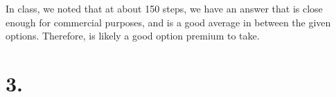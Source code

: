 \documentclass{article}
\begin{document}
{%

In class, we noted that at about 150 steps, we have an answer that is close enough for commercial purposes, and is a good average in between the given options. Therefore,  is likely a good option premium to take.

\newpage
}

\section*{3.}
\end{document}
